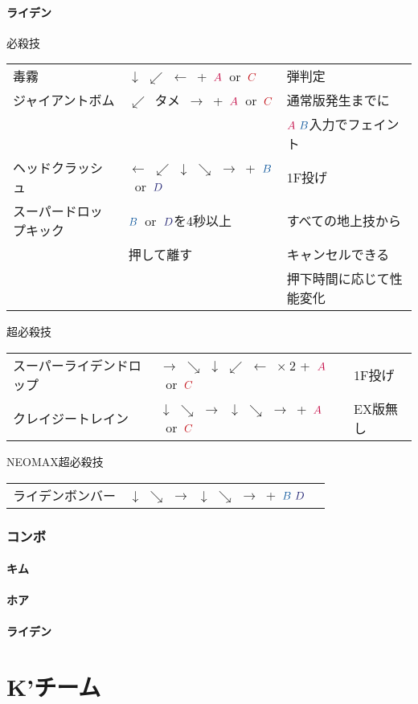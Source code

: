 \documentclass[a4j,11pt]{jarticle}
\def\A{\textcolor{Acolor}{A}}
\def\C{\textcolor{Ccolor}{C}}
\def\B{\textcolor{Bcolor}{B}}
\def\D{\textcolor{Dcolor}{D}}
\def\hien{$\swarrow$\ タメ\ $\rightarrow$}
\def\hado{$\downarrow$ $\searrow$ $\rightarrow$}%
\def\tatsu{$\downarrow$ $\swarrow$ $\leftarrow$}%
\def\yoga{$\leftarrow$ $\swarrow$ $\downarrow$ $\searrow$ $\rightarrow$}%
\def\gyakuyoga{$\rightarrow$ $\searrow$ $\downarrow$ $\swarrow$ $\leftarrow$}%
\begin{document}
\subsection{ライデン}
\begin{itembox}[l]{必殺技}
\begin{tabular}{lll}
毒霧&\tatsu\ +\ $\A$\ or\ $\C$&弾判定\\%
ジャイアントボム&\hien\ +\ $\A$\ or\ $\C$&通常版発生までに\\
&&$\A\ \B$入力でフェイント\\%
ヘッドクラッシュ&\yoga\ +\ $\B$\ or\ $\D$&1F投げ\\%
スーパードロップキック&$\B$\ or\ $\D$を4秒以上&すべての地上技から\\%
&押して離す&キャンセルできる\\
&&押下時間に応じて性能変化
\end{tabular}
\end{itembox}
\begin{itembox}[l]{超必殺技}
\begin{tabular}{lll}
スーパーライデンドロップ&\gyakuyoga\ $\times\ 2$ +\ $\A$\ or\ $\C$&1F投げ\\%
クレイジートレイン&\hado\ \hado\ +\ $\A$\ or\ $\C$&EX版無し%
\end{tabular}
\end{itembox}
\begin{itembox}[l]{NEOMAX超必殺技}
\begin{tabular}{lll}
ライデンボンバー&\hado\ \hado\ +\ $\B\ \D$&%
\end{tabular}
\end{itembox}
\newpage
\section{コンボ}
\subsection{キム}
\subsection{ホア}
\subsection{ライデン}
\newpage
\part{K'チーム}%
\end{document}
